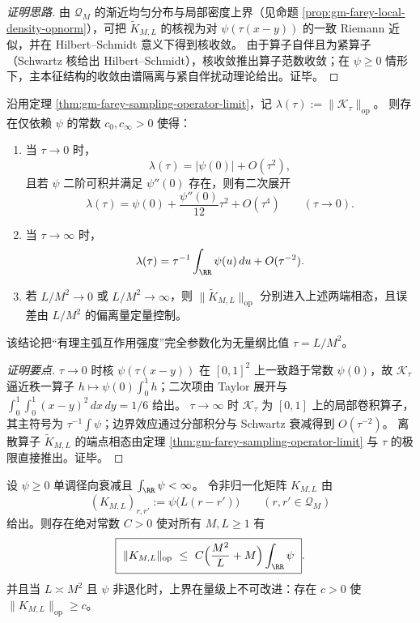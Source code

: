 \begin{proof}[证明思路]
由 \(\mathcal{Q}_M\) 的渐近均匀分布与局部密度上界（见命题 \ref{prop:gm-farey-local-density-opnorm}），可把 \(\widetilde K_{M,L}\) 的核视为对 \(\psi(\tau(x-y))\) 的一致 Riemann 近似，并在 Hilbert--Schmidt 意义下得到核收敛。
由于算子自伴且为紧算子（Schwartz 核给出 Hilbert--Schmidt），核收敛推出算子范数收敛；在 \(\psi\ge 0\) 情形下，主本征结构的收敛由谱隔离与紧自伴扰动理论给出。证毕。
\end{proof}

\begin{proposition}\label{prop:gm-farey-tau-spectral-phases}
沿用定理 \ref{thm:gm-farey-sampling-operator-limit}，记
\(
\lambda(\tau):=\|\mathcal{K}_\tau\|_{\mathrm{op}}
\)。
则存在仅依赖 \(\psi\) 的常数 \(c_0,c_\infty>0\) 使得：
\begin{enumerate}
  \item 当 \(\tau\to 0\) 时，
  \[
  \lambda(\tau)=|\psi(0)|+O(\tau^2),
  \]
  且若 \(\psi\) 二阶可积并满足 \(\psi''(0)\) 存在，则有二次展开
  \[
  \lambda(\tau)=\psi(0)+\frac{\psi''(0)}{12}\tau^2+O(\tau^4)
  \qquad(\tau\to 0).
  \]
  \item 当 \(\tau\to \infty\) 时，
  \[
  \lambda(\tau)=\tau^{-1}\int_{\RR}\psi(u)\,du+O(\tau^{-2}).
  \]
  \item 若 \(L/M^2\to 0\) 或 \(L/M^2\to\infty\)，则 \(\|\widetilde K_{M,L}\|_{\mathrm{op}}\) 分别进入上述两端相态，且误差由 \(L/M^2\) 的偏离量定量控制。
\end{enumerate}
该结论把“有理主弧互作用强度”完全参数化为无量纲比值 \(\tau=L/M^2\)。
\end{proposition}

\begin{proof}[证明要点]
\(\tau\to 0\) 时核 \(\psi(\tau(x-y))\) 在 \([0,1]^2\) 上一致趋于常数 \(\psi(0)\)，故 \(\mathcal{K}_\tau\) 逼近秩一算子 \(h\mapsto \psi(0)\int_0^1 h\)；二次项由 Taylor 展开与
\(
\int_0^1\!\int_0^1 (x-y)^2\,dx\,dy=1/6
\)
给出。
\(\tau\to\infty\) 时 \(\mathcal{K}_\tau\) 为 \([0,1]\) 上的局部卷积算子，其主符号为 \(\tau^{-1}\int\psi\)；边界效应通过分部积分与 Schwartz 衰减得到 \(O(\tau^{-2})\)。
离散算子 \(\widetilde K_{M,L}\) 的端点相态由定理 \ref{thm:gm-farey-sampling-operator-limit} 与 \(\tau\) 的极限直接推出。证毕。
\end{proof}

\begin{proposition}\label{prop:gm-farey-local-density-opnorm}
设 \(\psi\ge 0\) 单调径向衰减且 \(\int_{\RR}\psi<\infty\)。
令非归一化矩阵 \(K_{M,L}\) 由
\[
(K_{M,L})_{r,r'}:=\psi\!\bigl(L(r-r')\bigr)\qquad (r,r'\in\mathcal{Q}_M)
\]
给出。则存在绝对常数 \(C>0\) 使对所有 \(M,L\ge 1\) 有
\[
\boxed{\ \|K_{M,L}\|_{\mathrm{op}}\ \le\ C\Bigl(\frac{M^2}{L}+M\Bigr)\int_{\RR}\psi\ }.
\]
并且当 \(L\asymp M^2\) 且 \(\psi\) 非退化时，上界在量级上不可改进：存在 \(c>0\) 使 \(\|K_{M,L}\|_{\mathrm{op}}\ge c\)。
\end{proposition}

